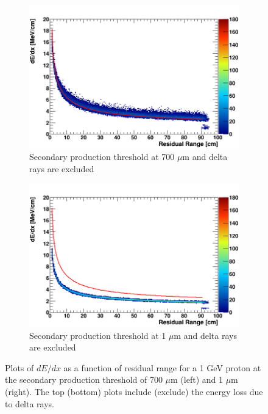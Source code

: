 \begin{figure}[tbp!]
\begin{subfigure}[b]{0.495\textwidth}
            \centering 
            \includegraphics[width=\textwidth]{derr_proton_only_700um}
            \caption{Secondary production threshold at 700 $\mu$m and delta rays are excluded}%
            \label{fig:derr_proton_only_700}
        \end{subfigure}
        \hfill
        \begin{subfigure}[b]{0.495\textwidth}   
            \centering 
            \includegraphics[width=\textwidth]{derr_proton_only_1um}
            \caption{Secondary production threshold at 1 $\mu$m and delta rays are excluded}%
            \label{fig:derr_proton_only_1}
        \end{subfigure}
        \caption{
	Plots of $dE/dx$ as a function of residual range for a 1 GeV proton at the secondary production threshold of 700 $\mu$m (left) and 1 $\mu$m (right). 
	The top (bottom) plots include (exclude) the energy loss due to delta rays. 
	}
        \label{fig:proton_derr}
\end{figure}

